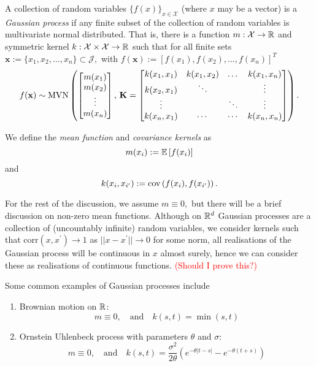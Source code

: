 \begin{definition}\label{def:gp}
    A collection of random variables $\{f(x)\}_{x\in\mathcal{X}}$
    (where $x$ may be a vector) is a \emph{Gaussian process} if any finite
    subset of the collection of random variables is multivariate normal
    distributed. That is, there is a function $m:\mathcal{X}\to\mathbb{R}$ and
    symmetric kernel $k:\mathcal{X}\times\mathcal{X}\to \mathbb{R}$ such that for all
    finite sets
    $\mathbf{x} :=\{x_1, x_2, \dots, x_n\} \subset \mathcal{J},$ with
    $f(\mathbf{x}) := [f(x_1), f(x_2), \dots, f(x_n)]^T$
    $$f(\mathbf{x}) \sim
        \operatorname{MVN}\left(\begin{bmatrix}
            m(x_1) \\ m(x_2)\\ \vdots\\ m(x_n)
        \end{bmatrix},\, \mathbf{K} = \begin{bmatrix}
            k(x_1, x_1) & k(x_1, x_2) & \dots  & k(x_1, x_n) \\
            k(x_2, x_1) & \ddots      &        & \vdots      \\
            \vdots      &             & \ddots & \vdots      \\
            k(x_n, x_1) & \cdots      & \cdots & k(x_n, x_n)
        \end{bmatrix}\right).$$
\end{definition}

\begin{definition}\label{def:mean_kernel}
    We define the \emph{mean function} and \emph{covariance kernels} as
    $$m(x_i) := \operatorname{\mathbb{E}}\left[f(x_i)\right]$$ and
    $$k(x_{i}, x_{i^\prime}) := \operatorname{cov}\left(f(x_i), f(x_{i^\prime})\right).$$
\end{definition}

For the rest of the discussion, we assume $m \equiv 0,$ but there will be a
brief discussion on non-zero mean functions. Although on $\mathbb{R}^d$ Gaussian
processes are a collection of (uncountably infinite)
random variables, we consider kernels such that
$\mathrm{corr}(x, x^\prime) \to 1$ as $||x - x^\prime||\to 0$ for some norm,
all realisations of the Gaussian process will be continuous in $x$ almost
surely, hence we can consider these as realisations of continuous functions.
\textcolor{red}{(Should I prove this?)}

Some common examples of Gaussian processes include \begin{enumerate}
    \item Brownian motion on $\mathbb{R}$:
          $$m\equiv 0, \quad \text{and}\quad k(s, t) = \min(s, t)$$
    \item Ornstein Uhlenbeck process with parameters $\theta$ and $\sigma$:
          $$
              m\equiv 0, \quad \text{and}
              \quad k(s, t)
              = \frac{\sigma^2}{2\theta} \left(
              e^{-\theta|t - s|} - e^{-\theta(t + s)}
              \right)
          $$
\end{enumerate}

